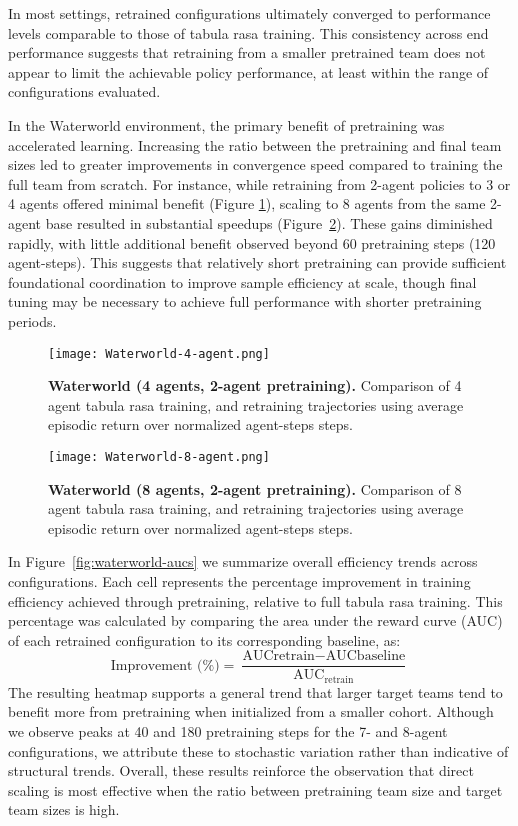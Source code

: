 \documentclass{article}
\begin{document}
In most settings, retrained configurations ultimately converged to 
performance levels comparable to those of tabula rasa training.
This consistency across end performance suggests that retraining from a smaller 
pretrained team does not appear to limit the achievable policy performance, 
at least within the range of configurations evaluated.

In the Waterworld environment, the primary benefit of pretraining was accelerated learning. 
Increasing the ratio between the pretraining and final team sizes led to greater improvements 
in convergence speed compared to training the full team from scratch. For instance, 
while retraining from 2-agent policies to 3 or 4 agents offered minimal benefit 
(Figure \ref{fig:waterworld-4}), scaling to 8 agents from the same 2-agent base resulted in 
substantial speedups (Figure~\ref{fig:waterworld-8}). These gains diminished rapidly, 
with little additional benefit observed beyond 60 pretraining steps (120 agent-steps).
This suggests that relatively short pretraining can provide sufficient foundational 
coordination to improve sample efficiency at scale, though final tuning may 
be necessary to achieve full performance with shorter pretraining periods.

\begin{figure}[!h]
    \centering
    \texttt{[image: Waterworld-4-agent.png]}
    \caption{\textbf{Waterworld (4 agents, 2-agent pretraining).} Comparison of 
    4 agent tabula rasa training, and retraining trajectories using average 
    episodic return over normalized agent-steps steps.}
    \label{fig:waterworld-4}
\end{figure}

\begin{figure}[!h]
    \centering
    \texttt{[image: Waterworld-8-agent.png]}
    \caption{\textbf{Waterworld (8 agents, 2-agent pretraining).} Comparison of 
    8 agent tabula rasa training, and retraining trajectories using average 
    episodic return over normalized agent-steps steps.}
    \label{fig:waterworld-8}
\end{figure}

In Figure~\ref{fig:waterworld-aucs} we summarize overall efficiency trends across configurations. 
Each cell represents the percentage improvement in training efficiency 
achieved through pretraining, relative to full tabula rasa training.
This percentage was calculated by comparing the area under the reward curve 
(AUC) of each retrained configuration to its corresponding baseline, as:
\[
    \text{Improvement (\%)} 
    = \frac{\text{AUC}{\text{retrain}} - \text{AUC}{\text{baseline}}}{\text{AUC}_{\text{retrain}}}
\]
The resulting heatmap supports a general trend that larger target teams tend to 
benefit more from pretraining when initialized from a smaller cohort.
Although we observe peaks at 40 and 180 pretraining steps for the 7- and 8-agent configurations, 
we attribute these to stochastic variation rather than indicative of structural trends.
Overall, these results reinforce the observation that direct scaling is most effective 
when the ratio between pretraining team size and target team sizes is high.
\end{document}
